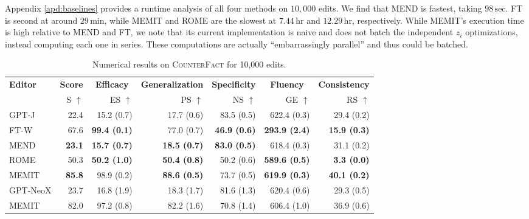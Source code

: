 \documentclass{article} %
\newcommand{\badmetric}[1]{{\color{rred} \textbf{#1}}}
\newcommand{\goodmetric}[1]{{\color{ggreen} \textbf{#1}}}
\newcommand{\cfd}{\textsc{CounterFact}\xspace}
\newcommand{\method}{MEMIT\xspace}
\newcommand{\iclrnew}[1]{#1}
\begin{document}
\iclrnew{Appendix \ref{apd:baselines} provides a runtime analysis of all four methods on $10{,}000$ edits. We find that MEND is fastest, taking $98\,\mathrm{sec}$. FT is second at around $29\,\mathrm{min}$, while \method and ROME are the slowest at $7.44\,\mathrm{hr}$ and $12.29\,\mathrm{hr}$, respectively. While \method's execution time is high relative to MEND and FT, we note that its current implementation is naive and does not batch the independent $z_i$ optimizations, instead computing each one in series. These computations are actually  ``embarrassingly parallel'' and thus could be batched.}


\addtolength{\tabcolsep}{2.1pt}

\begin{table}[!t]
    \centering
    \footnotesize
    \vspace{-10pt}
    \caption{\small Numerical results on \cfd for 10,000 edits.}
    \vspace{1pt}
    \label{tab:cf-results}
    \begin{adjustbox}{width=1\textwidth}
    \begin{tabular}{lrrrrrr}
    \toprule
        \multirow{2.5}{*}{\textbf{Editor}} & \multicolumn{1}{c}{\textbf{Score}} & \multicolumn{1}{c}{\textbf{Efficacy}} & \multicolumn{1}{c}{\textbf{Generalization}} & \multicolumn{1}{c}{\textbf{Specificity}} & \multicolumn{1}{c}{\textbf{Fluency}} & \multicolumn{1}{c}{\textbf{Consistency}} \\
        \cmidrule(lr){2-2}\cmidrule(lr){3-3}\cmidrule(lr){4-4}\cmidrule(lr){5-5}\cmidrule(lr){6-6}\cmidrule(lr){7-7}
        & S $\uparrow$ & ES $\uparrow$ & PS $\uparrow$ & NS $\uparrow$ & GE $\uparrow$ & RS $\uparrow$ \\
        \midrule
GPT-J & 22.4 & 15.2 (0.7) & 17.7 (0.6) & 83.5 (0.5)  & 622.4 (0.3) & 29.4 (0.2)\\\midrule
FT-W & 67.6 & \goodmetric{99.4 (0.1)} & 77.0 (0.7) & \badmetric{46.9 (0.6)} & \badmetric{293.9 (2.4)} & \badmetric{15.9 (0.3)}\\
MEND & \badmetric{23.1} & \badmetric{15.7 (0.7)} & \badmetric{18.5 (0.7)} & \goodmetric{83.0 (0.5)}  & 618.4 (0.3) & 31.1 (0.2)\\
ROME & 50.3 & \badmetric{50.2 (1.0)} & \badmetric{50.4 (0.8)}  & 50.2 (0.6)  & \badmetric{589.6 (0.5)} & \badmetric{3.3 (0.0)}\\
\method & \goodmetric{85.8} & 98.9 (0.2)  & \goodmetric{88.6 (0.5)}  & 73.7 (0.5)  & \goodmetric{619.9 (0.3)} & \goodmetric{40.1 (0.2)}\\
\midrule\midrule
GPT-NeoX & 23.7 & 16.8 (1.9) & 18.3 (1.7)  & 81.6 (1.3) & 620.4 (0.6) & 29.3 (0.5)\\\midrule
\method & 82.0 & 97.2 (0.8)  & 82.2 (1.6) & 70.8 (1.4)  & 606.4 (1.0) & 36.9 (0.6)\\
    \bottomrule
    \end{tabular}
    \end{adjustbox}
    \vspace{-10pt}
\end{table}%
\end{document}
